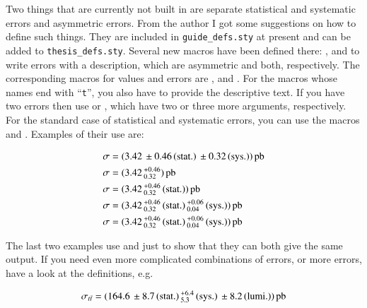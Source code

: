 Two things that are currently not built in are separate statistical and
systematic errors and asymmetric errors. From the author I got some
suggestions on how to define such things. They are included in
\texttt{guide\_defs.sty} at present and can be added to
\texttt{thesis\_defs.sty}.
Several new macros have been defined there:
,  and  to write
errors with a description, which are asymmetric and both, respectively.
The corresponding macros for values and errors are
,  and . For the macros
whose names end with \enquote{\texttt{t}}, you also have to provide
the descriptive text.
If you have two errors then use 
or , which have two or three more arguments, respectively.
For the standard case of statistical and systematic
errors, you can use the macros  and
. Examples of their use are:
\begin{tcblisting}{}
\begin{align*}
  \sigma & = \SIerrs{3.42}{0.46}{0.32}{\pico\barn}\\
  \sigma & = \SIpmerr{3.42}{0.46}{0.32}{\pico\barn}\\
  \sigma & = \SIpmerrt{3.42}{0.46}{0.32}{\stat}{\pico\barn}\\
  \sigma & = \SIpmerrs{3.42}{0.46}{0.32}{0.06}{0.04}{\pico\barn}\\
  \sigma & = \SIpmerrtt{3.42}{0.46}{0.32}{\stat}{0.06}{0.04}{\sys}{\pico\barn}
\end{align*}
\end{tcblisting}
The last two examples use  and  just
to show that they can both give the same output. If you need even more
complicated combinations of errors, or more errors, have a look at the
definitions, e.g.
\begin{tcblisting}{}
\begin{equation*}
  \sigma_{t\bar{t}} = (\num{164.6}%
  \valuesep\numerrt{8.7}{\stat}%
  \valuesep\numpmerrt{6.4}{5.3}{\sys}%
  \valuesep\numerrt{8.2}{lumi.})%
  \valuesep\si{\pico\barn}
\end{equation*}    
\end{tcblisting}


